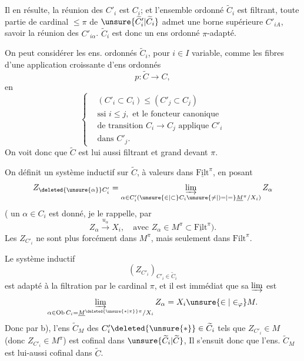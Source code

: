 Il en résulte,  la réunion des $C'_i$  est $C_i$; et l'ensemble ordonné $\widetilde C_i$ est filtrant,  toute partie  de cardinal $\leq\pi$ de $\unsure{\widetilde C'_i|\widetilde C_i}$ admet une borne supérieure $C'_{iA}$, savoir la réunion des $C'_{i\alpha}$. $\widetilde C_i$ est donc un ens ordonné $\pi$-adapté. 

On peut considérer les ens. ordonnés $\widetilde C_i$, pour $i\in I$ variable, comme les fibres d'une application croissante d'ens ordonnés
\[
p:\widetilde C\longrightarrow C,
\]
en  
\[
\left\{\begin{aligned}
&(C'_i\subset C_i)\leq(C'_j\subset C_j)\\
&\text{ssi }i\leq j,\text{ et le foncteur canonique}\\
&\text{de transition }C_i\longrightarrow C_j\text{ applique }C'_i\\
&\text{dans }C'_j.
\end{aligned}\right.
\]
On voit donc que $\widetilde C$ est lui aussi filtrant et grand devant $\pi$.

On définit un système inductif sur $\widetilde C$, à valeurs dans $\underline{\mathrm{Filt}}^{\pi}$, en posant
\[
Z_{\deleted{\unsure{\alpha}}C'_i}=\varinjlim_{\alpha\in C'_i(\unsure{\in|\subset}C_i\unsure{\neq|)=|=}\underline M^{\pi}/X_i)}Z_\alpha
\]
( un $\alpha\in C_i$ est donné, je le rappelle, par
\[
Z_\alpha\xrightarrow{u_\alpha}X_i,\quad\text{avec }Z_\alpha\in M^{\pi}\subset\underline{\mathrm{Filt}}^{\pi}).
\]
Les $Z_{C'_i}$ ne sont plus forcément dans $M^{\pi}$, mais seulement dans $\mathrm{Filt}^{\pi}$. 


Le système inductif
\[
(Z_{C'_i})_{C'_i\in\widetilde C_i}
\]
est   adapté à la filtration  par le cardinal $\pi$, et il est immédiat que sa $\varinjlim$ est 
\[
\varinjlim_{\alpha\in\operatorname{Ob}C_i=\underline M^{\deleted{\unsure{\ast|\pi}}\pi}/X_i}Z_\alpha=X_i\unsure{\in|\in_{\varphi}}M.
\]
Donc par b), l'ens  $\widetilde C_M$ des $C'_i\deleted{\unsure{\ast}}\in\widetilde C_i$ tels que $Z_{C'_i}\in M$ (donc $Z_{C'_i}\in M^{\pi}$) est cofinal dans $\unsure{\widetilde C_i|\widetilde C}$, Il s'ensuit donc que l'ens. $\widetilde C_M$ est lui-aussi cofinal dans $\widetilde C$.

